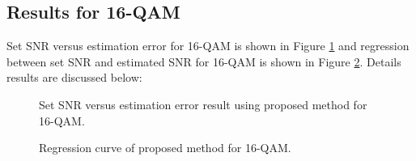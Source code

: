 \documentclass[12pt]{report}
\begin{document}
\subsection{Results for 16-QAM}
Set SNR versus estimation error for 16-QAM is shown in Figure \ref{fig:snrVserror_proposed_16} and regression between set SNR and estimated SNR for 16-QAM is shown in Figure \ref{fig:regression_proposed_16}. Details results are discussed below: 
\begin{figure}[htbp]
	\caption{Set SNR versus estimation error result using proposed method for 16-QAM.}
	\label{fig:snrVserror_proposed_16}
\end{figure}
\begin{figure}[htbp]
	\caption{Regression curve of proposed method for 16-QAM. }
	\label{fig:regression_proposed_16}
\end{figure}
\end{document}
